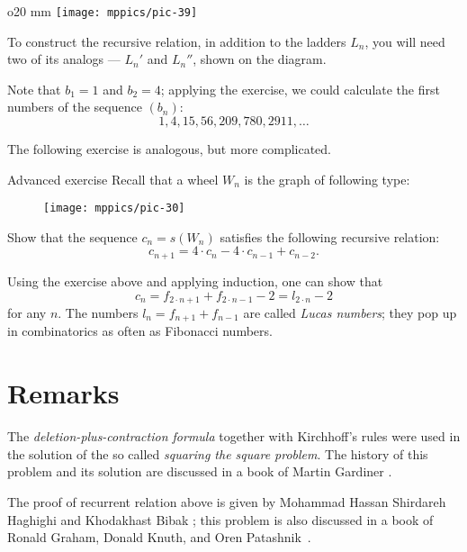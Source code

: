 \begin{wrapfigure}{o}{20 mm}
\vskip-4mm
\centering
\texttt{[image: mppics/pic-39]}
\end{wrapfigure}

 To construct the recursive relation, in addition to the ladders $L_n$, you will need two of its analogs --- $L_n'$ and $L_n''$, shown on the diagram.

\medskip

Note that $b_1=1$ and $b_2=4$; applying the exercise, we could calculate the first numbers of the sequence $(b_n)$:
\[1,4,15,56,209,780,2911,\dots \]

The following exercise is analogous, but more complicated.

\begin{thm}{Advanced exercise}
Recall that a wheel $W_n$ is the graph of following type:

\begin{figure}[h!]
\centering
\texttt{[image: mppics/pic-30]}
\end{figure}

Show that the sequence $c_n=s(W_n)$ satisfies the following recursive relation:
\[c_{n+1}=4\cdot c_n-4\cdot c_{n-1}+c_{n-2}.\]

\end{thm}

Using the exercise above and applying induction, one can show that 
\[c_n=f_{2\cdot n+1}+f_{2\cdot n-1}-2=l_{2\cdot  n}-2\]
for any $n$.
The numbers $l_n=f_{n+1}+f_{n-1}$ are called \emph{Lucas numbers};
they pop up in combinatorics as often as Fibonacci numbers.  

\section*{Remarks}

The \emph{deletion-plus-contraction formula} together with Kirchhoff's rules were used in the solution of the so called \emph{squaring the square problem}.
The history of this problem and its solution are discussed in a book of Martin Gardiner \cite[Chapter 17]{gardiner}.

The proof of recurrent relation above is given by Mohammad Hassan Shirdareh Haghighi and Khodakhast Bibak \cite{shirdareh-haghighi-bibak};
this problem is also discussed in a book of Ronald Graham, Donald Knuth, and Oren Patashnik~\cite{graham-knuth-patashnik}.

